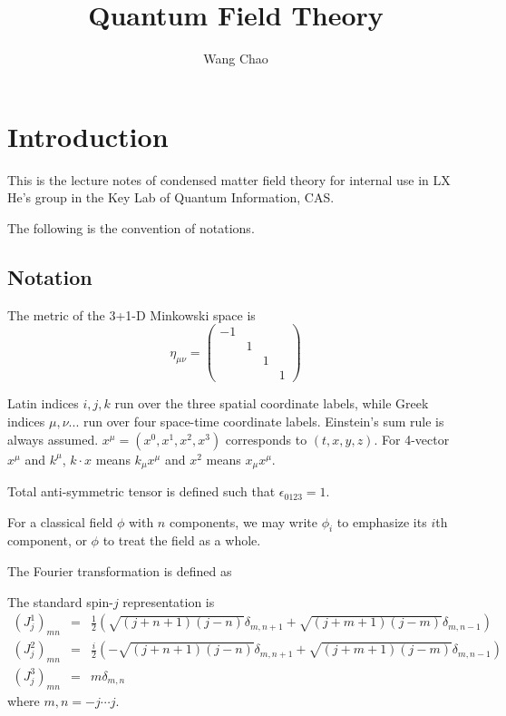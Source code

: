 \documentclass[12pt]{book}
\title{Quantum Field Theory}
\author{Wang Chao}
\begin{document}
 
\setcounter{chapter}{-1}  %
\maketitle

\tableofcontents
\chapter{Introduction}
	This is the lecture notes of condensed matter field theory for internal use in LX He's group in the Key Lab of Quantum Information, CAS.
	
	The following is the convention of notations.	
	\section{Notation}
	The metric of the 3+1-D Minkowski space is
	\begin{equation}
		\eta_{\mu\nu} =
		\left( \begin{array}{cccc}
		 -1 & & & \\
		 & 1 & & \\
		 & & 1 & \\
		 & & & 1
		\end{array} \right)
	\end{equation}
	
	Latin indices $i,j,k$ run over the three spatial coordinate labels, while Greek indices $\mu,\nu...$ run over four space-time coordinate labels. Einstein's sum rule is always assumed. $x^\mu=(x^0,x^1,x^2,x^3)$ corresponds to $(t,x,y,z)$. For 4-vector $x^\mu$ and $k^\mu$, $k\cdot x$ means $k_\mu x^\mu$ and $x^2$ means $x_\mu x^\mu$.
	
	Total anti-symmetric tensor is defined such that $\epsilon_{0123}=1$.
	
	
	For a classical field $\phi$ with $n$ components, we may write $\phi_i$ to emphasize its $i$th component, or  $\phi$ to treat the field as a whole. 
	
	The Fourier transformation is defined as
	
	The standard spin-$j$ representation is
	\begin{eqnarray}
		(J^1_j)_{mn}&=&\frac 12(\sqrt{(j+n+1)(j-n)}\delta_{m,n+1}+\sqrt{(j+m+1)(j-m)}\delta_{m,n-1})\label{eqn:spin-1}\\
		(J^2_j)_{mn}&=&\frac i2(-\sqrt{(j+n+1)(j-n)}\delta_{m,n+1}+\sqrt{(j+m+1)(j-m)}\delta_{m,n-1})\label{eqn:spin-2}\\
		(J^3_j)_{mn}&=&m\delta_{m,n}\label{eqn:spin-3}
	\end{eqnarray}
	where $m,n=-j\cdots j$.
	
\end{document}
